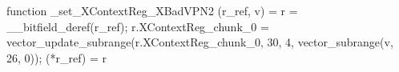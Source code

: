 function _set_XContextReg_XBadVPN2 (r_ref, v) = {
    r = __bitfield_deref(r_ref);
    r.XContextReg_chunk_0 = vector_update_subrange(r.XContextReg_chunk_0, 30, 4, vector_subrange(v, 26, 0));
    (*r_ref) = r
}
